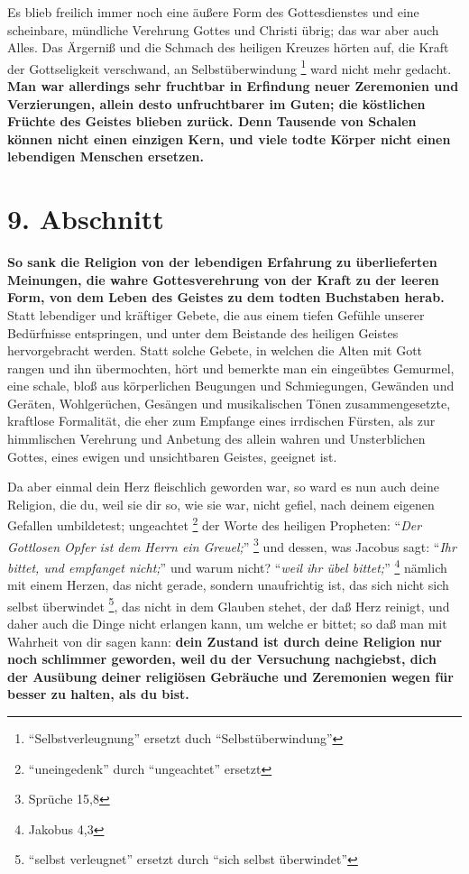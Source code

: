 \medskip 

Es blieb freilich immer noch eine äußere Form des Gottesdienstes und eine
scheinbare, mündliche Verehrung Gottes und Christi übrig; das war aber auch
Alles. Das Ärgerniß und die Schmach des heiligen Kreuzes hörten auf, die Kraft
der Gottseligkeit verschwand, an Selbstüberwindung
\footnote{"`Selbstverleugnung"' ersetzt duch "`Selbstüberwindung"'}
ward nicht mehr gedacht. \textbf{Man
war allerdings sehr fruchtbar in Erfindung neuer Zeremonien und Verzierungen,
allein desto unfruchtbarer im Guten; die köstlichen Früchte des Geistes blieben
zurück. Denn Tausende von Schalen können nicht einen einzigen Kern, und viele
todte Körper nicht einen lebendigen Menschen ersetzen.}

\section{9. Abschnitt}  \label{kap2_ab9}

\textbf{So sank die Religion von der lebendigen Erfahrung zu überlieferten
Meinungen,
die wahre Gottesverehrung von der Kraft zu der leeren Form, von dem Leben des
Geistes zu dem todten Buchstaben herab.} Statt lebendiger und kräftiger Gebete,
die aus einem tiefen Gefühle unserer Bedürfnisse entspringen, und unter dem
Beistande des heiligen Geistes hervorgebracht werden. Statt solche Gebete,
in welchen die Alten mit Gott rangen und ihn übermochten,
hört und bemerkte man ein
eingeübtes Gemurmel, eine schale, bloß aus körperlichen Beugungen und
Schmiegungen, Gewänden und Geräten, Wohlgerüchen, Gesängen und musikalischen
Tönen zusammengesetzte, kraftlose Formalität, die eher zum Empfange eines
irrdischen Fürsten, als zur himmlischen Verehrung und Anbetung des allein wahren
und Unsterblichen Gottes, eines ewigen und unsichtbaren Geistes, geeignet ist.

\medskip 

Da aber einmal dein Herz fleischlich geworden war, so ward es nun auch deine
Religion, die du, weil sie dir so, wie sie war, nicht gefiel, nach deinem
eigenen Gefallen umbildetest; ungeachtet \footnote{"`uneingedenk"' durch
"`ungeachtet"' ersetzt} der Worte des heiligen Propheten:
"`\textit{Der Gottlosen Opfer ist dem Herrn ein Greuel;}"'
\footnote{Sprüche 15,8}  und
dessen, was Jacobus sagt: "`\textit{Ihr bittet, und empfanget nicht;}"' und warum
nicht? "`\textit{weil ihr übel bittet;}"' \footnote{Jakobus 4,3}
 nämlich mit einem
Herzen, das nicht gerade, sondern unaufrichtig ist, das sich nicht sich
selbst überwindet \footnote{"`selbst verleugnet"' ersetzt durch "`sich
selbst überwindet"'}, das nicht in dem Glauben stehet, der daß Herz reinigt,
und daher
auch die Dinge nicht erlangen kann, um welche er bittet; so daß man mit
Wahrheit von dir sagen kann: \textbf{dein Zustand ist durch deine Religion nur noch
schlimmer geworden, weil du der Versuchung nachgiebst, dich der Ausübung
deiner religiösen Gebräuche und Zeremonien wegen für besser zu halten, als du
bist.}

